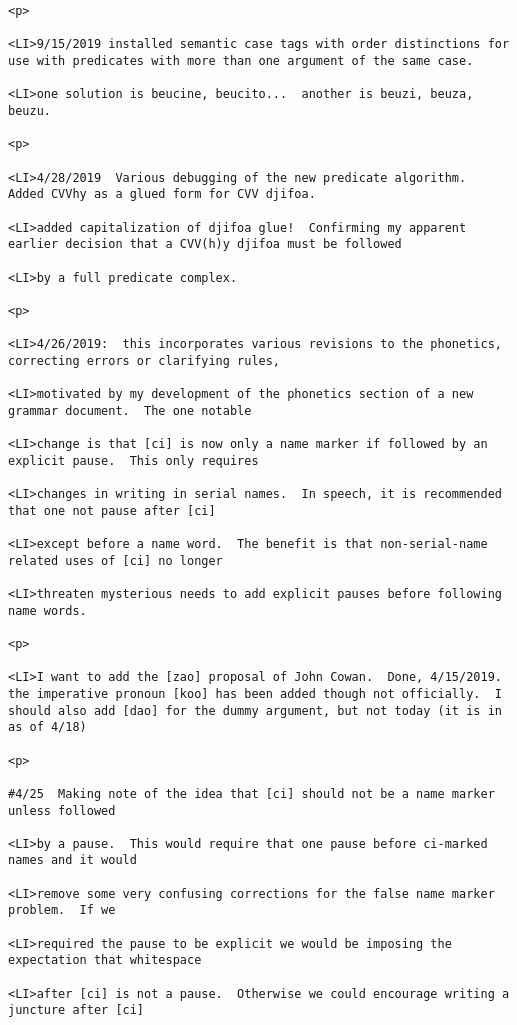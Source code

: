 \documentclass[12pt]{article}
\begin{document}
\begin{lstlisting}
<p>

<LI>9/15/2019 installed semantic case tags with order distinctions for use with predicates with more than one argument of the same case.

<LI>one solution is beucine, beucito...  another is beuzi, beuza, beuzu.

<p>

<LI>4/28/2019  Various debugging of the new predicate algorithm.  Added CVVhy as a glued form for CVV djifoa.

<LI>added capitalization of djifoa glue!  Confirming my apparent earlier decision that a CVV(h)y djifoa must be followed

<LI>by a full predicate complex.

<p>

<LI>4/26/2019:  this incorporates various revisions to the phonetics, correcting errors or clarifying rules,

<LI>motivated by my development of the phonetics section of a new grammar document.  The one notable

<LI>change is that [ci] is now only a name marker if followed by an explicit pause.  This only requires

<LI>changes in writing in serial names.  In speech, it is recommended that one not pause after [ci]

<LI>except before a name word.  The benefit is that non-serial-name related uses of [ci] no longer

<LI>threaten mysterious needs to add explicit pauses before following name words.

<p>

<LI>I want to add the [zao] proposal of John Cowan.  Done, 4/15/2019.  the imperative pronoun [koo] has been added though not officially.  I should also add [dao] for the dummy argument, but not today (it is in as of 4/18)

<p>

#4/25  Making note of the idea that [ci] should not be a name marker unless followed

<LI>by a pause.  This would require that one pause before ci-marked names and it would

<LI>remove some very confusing corrections for the false name marker problem.  If we

<LI>required the pause to be explicit we would be imposing the expectation that whitespace

<LI>after [ci] is not a pause.  Otherwise we could encourage writing a juncture after [ci]


\end{lstlisting}
\end{document}
